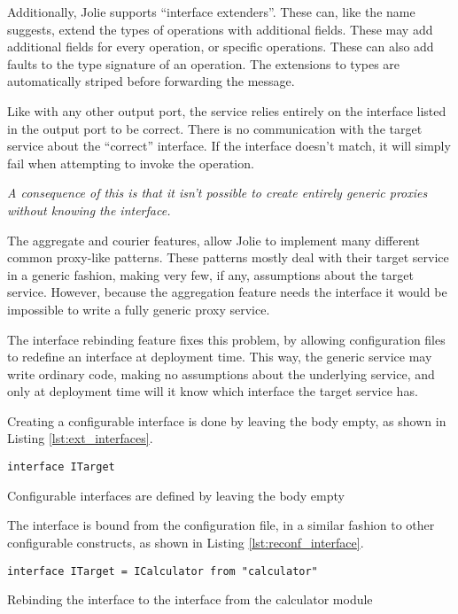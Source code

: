 Additionally, Jolie supports ``interface extenders''. These can, like the name
suggests, extend the types of operations with additional fields. These may add
additional fields for every operation, or specific operations. These can also
add faults to the type signature of an operation. The extensions to types are
automatically striped before forwarding the message.

Like with any other output port, the service relies entirely on the interface
listed in the output port to be correct. There is no communication with the
target service about the ``correct'' interface. If the interface doesn't match,
       it will simply fail when attempting to invoke the operation.

\emph{A consequence of this is that it isn't possible to create entirely generic
proxies without knowing the interface.}

The aggregate and courier features, allow Jolie to implement many different
common proxy-like patterns. These patterns mostly deal with their target
service in a generic fashion, making very few, if any, assumptions about the
target service. However, because the aggregation feature needs the interface it
would be impossible to write a fully generic proxy service.

The interface rebinding feature fixes this problem, by allowing configuration
files to redefine an interface at deployment time. This way, the generic
service may write ordinary code, making no assumptions about the underlying
service, and only at deployment time will it know which interface the target
service has.

Creating a configurable interface is done by leaving the body empty, as shown
in Listing \ref{lst:ext_interfaces}.

\begin{listing}[H]
\begin{verbatim}
interface ITarget
\end{verbatim}
\caption{Configurable interfaces are defined by leaving the body empty}
\label{lst:ext_interfaces}
\end{listing}

The interface is bound from the configuration file, in a similar fashion to
other configurable constructs, as shown in Listing \ref{lst:reconf_interface}.

\begin{listing}[H]
\begin{verbatim}
interface ITarget = ICalculator from "calculator"
\end{verbatim}

\caption{Rebinding the  interface to the 
    interface from the calculator module}

\label{lst:reconf_interface}
\end{listing}

